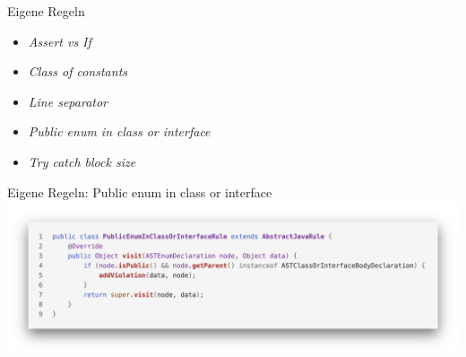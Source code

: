 \documentclass{sdqbeamer}
\begin{document}
\begin{frame}{Eigene Regeln}
    \begin{itemize}
        \item \textit{Assert vs If}
        \item \textit{Class of constants}
        \item \textit{Line separator}
        \item \textit{Public enum in class or interface}
        \item \textit{Try catch block size}
    \end{itemize}
\end{frame}

\begin{frame}[fragile]{Eigene Regeln: Public enum in class or interface}
    \vspace{-0.5cm}
    \hspace{-0.7cm}
    \includegraphics[scale=0.23]{logos/CustomRulePublicEnumInClassOrInterface.png}
\end{frame}
\end{document}
